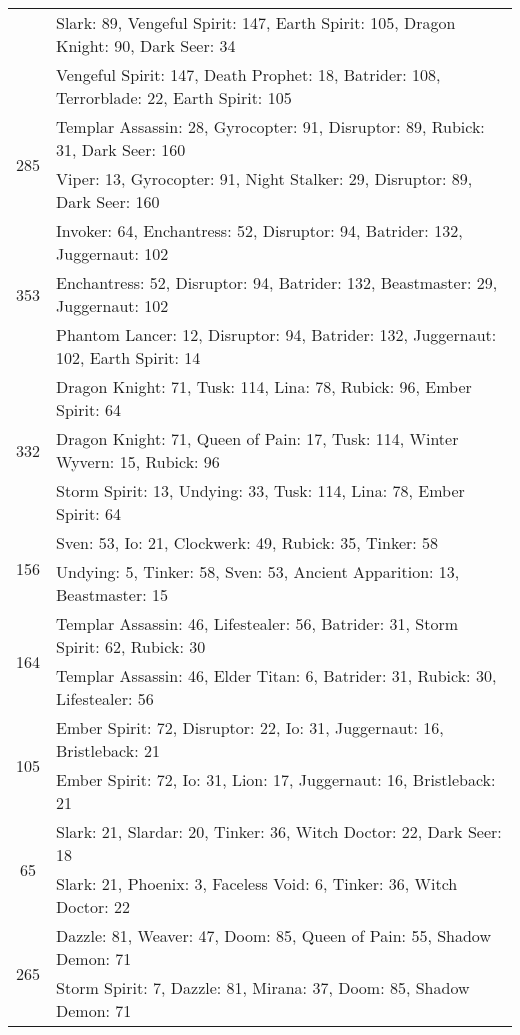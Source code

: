 \documentclass[result.tex]{subfiles}
\begin{document}
\begin{table}[H]
\begin{tabular}{ | c | p{12.5cm} | }
& Slark: 89, Vengeful Spirit: 147, Earth Spirit: 105, Dragon Knight: 90, Dark Seer: 34 \\
& Vengeful Spirit: 147, Death Prophet: 18, Batrider: 108, Terrorblade: 22, Earth Spirit: 105 \\
\hline
\multirow{2}{*}{285}
& Templar Assassin: 28, Gyrocopter: 91, Disruptor: 89, Rubick: 31, Dark Seer: 160 \\
& Viper: 13, Gyrocopter: 91, Night Stalker: 29, Disruptor: 89, Dark Seer: 160 \\
\hline
\multirow{3}{*}{353}
& Invoker: 64, Enchantress: 52, Disruptor: 94, Batrider: 132, Juggernaut: 102 \\
& Enchantress: 52, Disruptor: 94, Batrider: 132, Beastmaster: 29, Juggernaut: 102 \\
& Phantom Lancer: 12, Disruptor: 94, Batrider: 132, Juggernaut: 102, Earth Spirit: 14 \\
\hline
\multirow{3}{*}{332}
& Dragon Knight: 71, Tusk: 114, Lina: 78, Rubick: 96, Ember Spirit: 64 \\
& Dragon Knight: 71, Queen of Pain: 17, Tusk: 114, Winter Wyvern: 15, Rubick: 96 \\
& Storm Spirit: 13, Undying: 33, Tusk: 114, Lina: 78, Ember Spirit: 64 \\
\hline
\multirow{2}{*}{156}
& Sven: 53, Io: 21, Clockwerk: 49, Rubick: 35, Tinker: 58 \\
& Undying: 5, Tinker: 58, Sven: 53, Ancient Apparition: 13, Beastmaster: 15 \\
\hline
\multirow{2}{*}{164}
& Templar Assassin: 46, Lifestealer: 56, Batrider: 31, Storm Spirit: 62, Rubick: 30 \\
& Templar Assassin: 46, Elder Titan: 6, Batrider: 31, Rubick: 30, Lifestealer: 56 \\
\hline
\multirow{2}{*}{105}
& Ember Spirit: 72, Disruptor: 22, Io: 31, Juggernaut: 16, Bristleback: 21 \\
& Ember Spirit: 72, Io: 31, Lion: 17, Juggernaut: 16, Bristleback: 21 \\
\hline
\multirow{2}{*}{65}
& Slark: 21, Slardar: 20, Tinker: 36, Witch Doctor: 22, Dark Seer: 18 \\
& Slark: 21, Phoenix: 3, Faceless Void: 6, Tinker: 36, Witch Doctor: 22 \\
\hline
\multirow{2}{*}{265}
& Dazzle: 81, Weaver: 47, Doom: 85, Queen of Pain: 55, Shadow Demon: 71 \\
& Storm Spirit: 7, Dazzle: 81, Mirana: 37, Doom: 85, Shadow Demon: 71 \\

\end{tabular}
\end{table}
\end{document}
